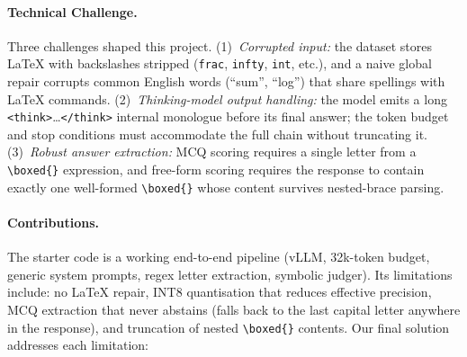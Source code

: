\documentclass{article}
\begin{document}
\paragraph{Technical Challenge.}
Three challenges shaped this project.
(1)~\textit{Corrupted input:} the dataset stores LaTeX with backslashes
stripped (\texttt{frac}, \texttt{infty}, \texttt{int}, etc.), and a naive
global repair corrupts common English words (``sum'', ``log'') that share
spellings with LaTeX commands.
(2)~\textit{Thinking-model output handling:} the model emits a long
\texttt{<think>}\ldots\texttt{</think>} internal monologue before its final
answer; the token budget and stop conditions must accommodate the full chain
without truncating it.
(3)~\textit{Robust answer extraction:} MCQ scoring requires a single letter
from a \texttt{\textbackslash boxed\{\}} expression, and free-form scoring
requires the response to contain exactly one well-formed
\texttt{\textbackslash boxed\{\}} whose content survives nested-brace parsing.

\paragraph{Contributions.}
The starter code is a working end-to-end pipeline (vLLM, 32k-token budget,
generic system prompts, regex letter extraction, symbolic judger).
Its limitations include:
no LaTeX repair,
INT8 quantisation that reduces effective precision,
MCQ extraction that never abstains (falls back to the last capital letter
anywhere in the response),
and truncation of nested \texttt{\textbackslash boxed\{\}} contents.
Our final solution addresses each limitation:
\end{document}

